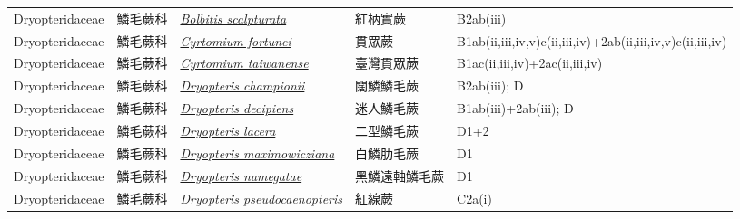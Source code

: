 {\begin{longtable}{p{2.5cm}p{2.5cm}p{4.5cm}p{2.5cm}p{3cm}}
    Dryopteridaceae & 鱗毛蕨科 & \href{http://www.theplantlist.org/tpl1.1/search?q=Bolbitis+scalpturata}{\textit{Bolbitis scalpturata} } & 紅柄實蕨 & B2ab(iii) \index{Bolbitis@\textit{Bolbitis}!scalpturata@\textit{scalpturata}}  \index{紅柄實蕨} \\
    Dryopteridaceae & 鱗毛蕨科 & \href{http://www.theplantlist.org/tpl1.1/search?q=Cyrtomium+fortunei}{\textit{Cyrtomium fortunei} } & 貫眾蕨 & B1ab(ii,iii,iv,v)c(ii,iii,iv)+2ab(ii,iii,iv,v)c(ii,iii,iv) \index{Cyrtomium@\textit{Cyrtomium}!fortunei@\textit{fortunei}}  \index{貫眾蕨} \\
    Dryopteridaceae & 鱗毛蕨科 & \href{http://www.theplantlist.org/tpl1.1/search?q=Cyrtomium+taiwanense}{\textit{Cyrtomium taiwanense} } & 臺灣貫眾蕨 & B1ac(ii,iii,iv)+2ac(ii,iii,iv) \index{Cyrtomium@\textit{Cyrtomium}!taiwanense@\textit{taiwanense}}  \index{臺灣貫眾蕨} \\
    Dryopteridaceae & 鱗毛蕨科 & \href{http://www.theplantlist.org/tpl1.1/search?q=Dryopteris+championii}{\textit{Dryopteris championii} } & 闊鱗鱗毛蕨 & B2ab(iii); D \index{Dryopteris@\textit{Dryopteris}!championii@\textit{championii}}  \index{闊鱗鱗毛蕨} \\
    Dryopteridaceae & 鱗毛蕨科 & \href{http://www.theplantlist.org/tpl1.1/search?q=Dryopteris+decipiens}{\textit{Dryopteris decipiens} } & 迷人鱗毛蕨 & B1ab(iii)+2ab(iii); D \index{Dryopteris@\textit{Dryopteris}!decipiens@\textit{decipiens}}  \index{迷人鱗毛蕨} \\
    Dryopteridaceae & 鱗毛蕨科 & \href{http://www.theplantlist.org/tpl1.1/search?q=Dryopteris+lacera}{\textit{Dryopteris lacera} } & 二型鱗毛蕨 & D1+2 \index{Dryopteris@\textit{Dryopteris}!lacera@\textit{lacera}}  \index{二型鱗毛蕨} \\
    Dryopteridaceae & 鱗毛蕨科 & \href{http://www.theplantlist.org/tpl1.1/search?q=Dryopteris+maximowicziana}{\textit{Dryopteris maximowicziana} } & 白鱗肋毛蕨 & D1 \index{Dryopteris@\textit{Dryopteris}!maximowicziana@\textit{maximowicziana}}  \index{白鱗肋毛蕨} \\
    Dryopteridaceae & 鱗毛蕨科 & \href{http://www.theplantlist.org/tpl1.1/search?q=Dryopteris+namegatae}{\textit{Dryopteris namegatae} } & 黑鱗遠軸鱗毛蕨 & D1 \index{Dryopteris@\textit{Dryopteris}!namegatae@\textit{namegatae}}  \index{黑鱗遠軸鱗毛蕨} \\
    Dryopteridaceae & 鱗毛蕨科 & \href{http://www.theplantlist.org/tpl1.1/search?q=Dryopteris+pseudocaenopteris}{\textit{Dryopteris pseudocaenopteris} } & 紅線蕨 & C2a(i) \index{Dryopteris@\textit{Dryopteris}!pseudocaenopteris@\textit{pseudocaenopteris}}  \index{紅線蕨} \\

\end{longtable}}
